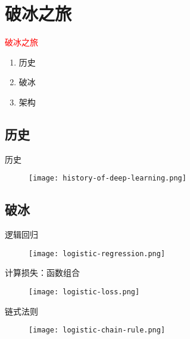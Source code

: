 \section{破冰之旅}
\label{sec:logistic}

\begin{frame}
  \begin{center}
    \Huge{\textcolor{red}{破冰之旅}}
  \end{center}

  \begin{enumerate}
    \item \alert{历史}
    \item \alert{破冰}
    \item \alert{架构}    
  \end{enumerate}
\end{frame}

\subsection{历史}

\begin{frame}[fragile]{历史}
  \begin{figure}
    \centering
    \texttt{[image: history-of-deep-learning.png]}
  \end{figure}
\end{frame}

\subsection{破冰}

\begin{frame}[fragile]{逻辑回归}
  \begin{figure}
    \centering
    \texttt{[image: logistic-regression.png]}
  \end{figure}
\end{frame}

\begin{frame}[fragile]{计算损失：函数组合}
  \begin{figure}
    \centering
    \texttt{[image: logistic-loss.png]}
  \end{figure}
\end{frame}

\begin{frame}[fragile]{链式法则}
  \begin{figure}
    \centering
    \texttt{[image: logistic-chain-rule.png]}
  \end{figure}
\end{frame}

